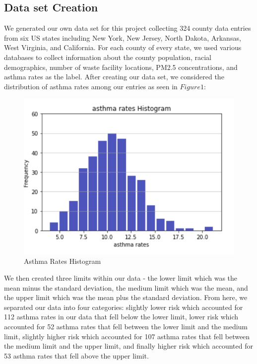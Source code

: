 \documentclass{article}
\begin{document}
\subsection{Data set Creation}
\label{dataset generation}

We generated our own data set for this project collecting 324 county data entries from six US states including New York, New Jersey, North Dakota, Arkansas, West Virginia, and California. For each county of every state, we used various databases to collect information about the county population, racial demographics, number of waste facility locations, PM2.5 concentrations, and asthma rates as the label. After creating our data set, we considered the distribution of asthma rates among our entries as seen in $Figure 1$: 

\begin{figure}[h]
\caption{Asthma Rates Histogram}
\centering
\includegraphics[scale=0.75]{Asthma Rates Histogram.png}
\end{figure}

We then created three limits within our data - the lower limit which was the mean minus the standard deviation, the medium limit which was the mean, and the upper limit which was the mean plus the standard deviation. From here, we separated our data into four categories: slightly lower risk which accounted for 112 asthma rates in our data that fell below the lower limit, lower risk which accounted for 52 asthma rates that fell between the lower limit and the medium limit, slightly higher risk which accounted for 107 asthma rates that fell between the medium limit and the upper limit, and finally higher risk which accounted for 53 asthma rates that fell above the upper limit. 
\end{document}
